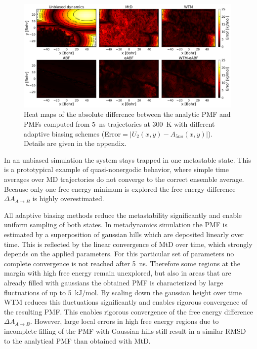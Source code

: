 \begin{figure}[H]
  \centering
  \includegraphics[width=0.99\textwidth]{bilder/test_2D/error_5ns}
  \caption{Heat maps of the absolute difference between the analytic PMF and PMFs computed from 5~ns trajectories at 300~K with different adaptive biasing schemes (Error$=|U_2(x,y)-A_{5ns}(x,y)|$). Details are given in the appendix.}
\label{fig:error 2D}%
\end{figure}
In an unbiased simulation the system stays trapped in one metastable state.
This is a prototypical example of quasi-nonergodic behavior, where simple time averages over MD trajectories do not converge to the correct ensemble average.
Because only one free energy minimum is explored the free energy difference $\Delta A_{A\to B}$ is highly overestimated.

All adaptive biasing methods reduce the metastability significantly and enable uniform sampling of both states.
In metadynamics simulation the PMF is estimated by a superposition of gaussian hills which are deposited linearly over time.
This is reflected by the linear convergence of MtD over time, which strongly depends on the applied parameters.
For this particular set of parameters no complete convergence is not reached after 5~ns.
Therefore some regions at the margin with high free energy remain unexplored, but also in areas that are already filled with gaussians the obtained PMF is characterized by large fluctuations of up to 5~kJ/mol.
By scaling down the gaussian height over time WTM reduces this fluctuations significantly and enables rigorous convergence of the resulting PMF.
This enables rigorous convergence of the free energy difference $\Delta A_{A\to B}$.
However, large local errors in high free energy regions due to incomplete filling of the PMF with Gaussian hills still result in a similar RMSD to the analytical PMF than obtained with MtD.






